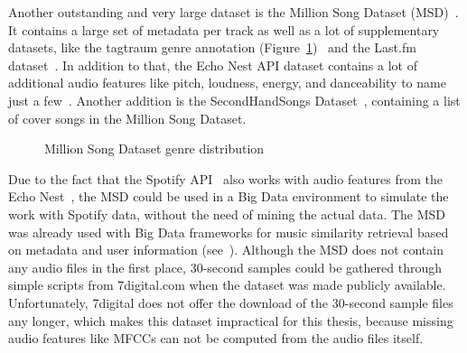Another outstanding and very large dataset is the Million Song Dataset (MSD)~\cite{msd1}. 
It contains a large set of metadata per track as well as a lot of supplementary datasets, like the tagtraum genre annotation (Figure~\ref{msddist})~\cite{msd5} and the Last.fm dataset~\cite{msd2}. In addition to that, the Echo Nest API dataset contains a lot of additional audio features like pitch, loudness, energy, and danceability to name just a few~\cite{msd3}. 
Another addition is the SecondHandSongs Dataset~\cite{msd6}, containing a list of cover songs in the Million Song Dataset.
\begin{figure}[thpb]
	\centering
	\caption{Million Song Dataset genre distribution~\cite[p. 6]{msd5}}
	\label{msddist}
\end{figure}
\FloatBarrier
\noindent Due to the fact that the Spotify API~\cite{spotifyapi1} also works with audio features from the Echo Nest~\cite{echonest1}, the MSD could be used in a Big Data environment to simulate the work with Spotify data, without the need of mining the actual data. The MSD was already used with Big Data frameworks for music similarity retrieval based on metadata and user information (see~\cite{msd4}). Although the MSD does not contain any audio files in the first place, 30-second samples could be gathered through simple scripts from 7digital.com when the dataset was made publicly available. Unfortunately, 7digital does not offer the download of the 30-second sample files any longer, which makes this dataset impractical for this thesis, because missing audio features like MFCCs can not be computed from the audio files itself. 
